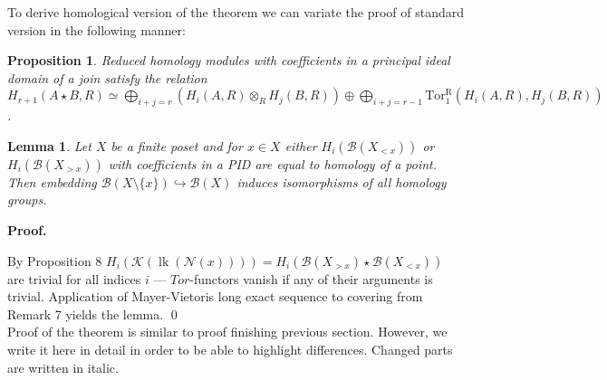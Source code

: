 \documentclass[a4paper, 12pt]{article}
\newtheorem{proposition}{Proposition}
\newtheorem{lemma}{Lemma}
\theoremstyle{definition}
\theoremstyle{remark}
\newenvironment{pf}{\noindent\textbf{Proof.}}{\qed}
\begin{document}
To derive homological version of the theorem we can variate the proof of standard version in the following manner:\\

\begin{proposition} {\cite[Lemma 2.1]{Milnor56}}
  Reduced homology modules with coefficients in a principal ideal domain of a join satisfy the relation
  $H_{r+1}(A \star B, R) \simeq \bigoplus_{i+j=r}(H_i(A,R) \otimes_R H_j(B,R)) \oplus \bigoplus_{i+j=r-1} \operatorname{Tor_1^R}(H_i(A,R),H_j(B,R))$.
\end{proposition}

\begin{lemma}
  Let $X$ be a finite poset and for $x \in X$ either $H_i(\mathcal{B}(X_{< x}))$ or $H_i(\mathcal{B}(X_{> x}))$ with coefficients in a PID are equal to homology of a point. Then embedding $\mathcal{B}(X \setminus \{x\}) \hookrightarrow \mathcal{B}(X)$ induces isomorphisms of all homology groups.
\end{lemma}

\begin{pf} ~ \par
  By Proposition 8 $H_i(\mathcal{K}(\operatorname{lk}(\mathcal{N}(x)))) = H_i(\mathcal{B}(X_{>x}) \star \mathcal{B}(X_{<x}))$ are trivial for all indices $i$ --- $Tor$-functors vanish if any of their arguments is trivial.
  Application of Mayer-Vietoris long exact sequence to covering from Remark 7 yields the lemma.
\end{pf}\\

Proof of the theorem is similar to proof finishing previous section. However, we write it here in detail in order to be able to highlight differences. Changed parts are written in italic.\\
\end{document}
